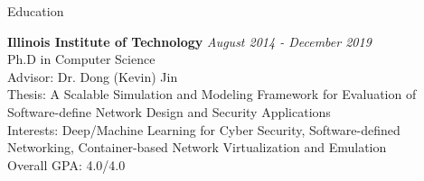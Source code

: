 \documentclass{resume} %
\begin{document}
\lastupdated


\begin{rSection}{Education}

{\bf Illinois Institute of Technology} \hfill {\em August 2014 - December 2019} \\ 
Ph.D in Computer Science \\
Advisor: Dr. Dong (Kevin) Jin \\
Thesis: A Scalable Simulation and Modeling Framework for Evaluation of Software-define Network Design and Security Applications \\
Interests: Deep/Machine Learning for Cyber Security, Software-defined Networking, Container-based Network Virtualization and Emulation \\
Overall GPA: 4.0/4.0



\end{rSection}

\end{document}
